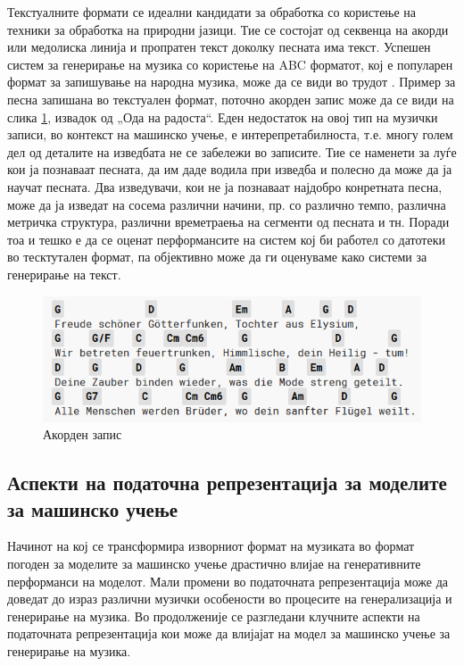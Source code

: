 Текстуалните формати се идеални кандидати за обработка со користење на техники за обработка на природни јазици. Тие се состојат од секвенца на акорди или медолиска линија и пропратен текст доколку песната има текст. Успешен систем за генерирање на музика со користење на ABC форматот, кој е популарен формат за запишување на народна музика, може да се види во трудот \cite{Sturm2015}. Пример за песна запишана во текстуален формат, поточно акорден запис може да се види на слика \ref{fig:akordi}, извадок од „Ода на радоста“. Еден недостаток на овој тип на музички записи, во контекст на машинско учење, е интерепретабилноста, т.е. многу голем дел од деталите на изведбата не се забележи во записите. Тие се наменети за луѓе кои ја познаваат песната, да им даде водила при изведба и полесно да може да ја научат песната. Два изведувачи, кои не ја познаваат најдобро конретната песна, може да ја изведат на сосема различни начини, пр. со различно темпо, различна метричка структура, различни времетраења на сегменти од песната и тн. Поради тоа и тешко е да се оценат перформансите на систем кој би работел со датотеки во тесктутален формат, па објективно може да ги оценуваме како системи за генерирање на текст.

\begin{figure}[H]
	\centering
\includegraphics[scale=0.9]{images/ode_to_joy.png}
	\caption{Акорден запис}
	\label{fig:akordi}
\end{figure}

\subsection{Аспекти на податочна репрезентација за моделите за машинско учење}

Начинот на кој се трансформира изворниот формат на музиката во формат погоден за моделите за машинско учење драстично влијае на генеративните перформанси на моделот. Мали промени во податочната репрезентација може да доведат до израз различни музички особености во процесите на генерализација и генерирање на музика. Во продолженије се разгледани клучните аспекти на податочната репрезентација кои може да влијајат на модел за машинско учење за генерирање на музика.

